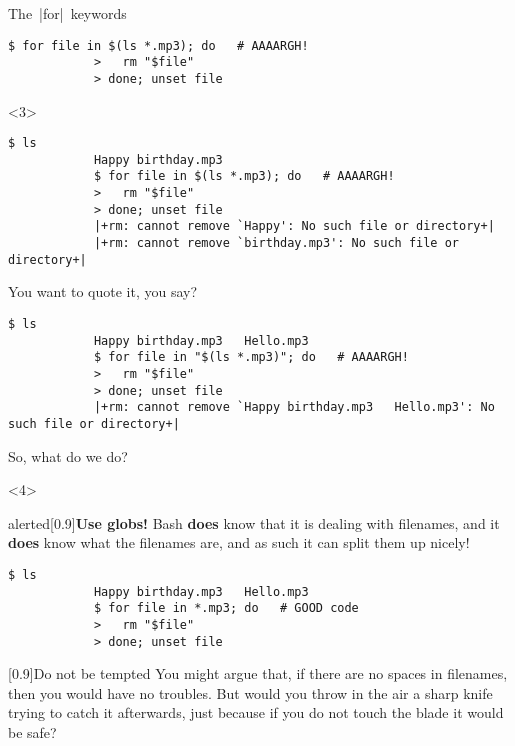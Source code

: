 \begin{frame}[fragile]{The \,\bash|for|\, keywords}
\begin{onlyenv}
\begin{lstlisting}[style=MyBash, xrightmargin=4mm]
            $ for file in $(ls *.mp3); do   # AAAARGH!
            >   rm "$file"
            > done; unset file
        \end{lstlisting}
    \end{onlyenv}
    \begin{onlyenv}<3>
        \begin{lstlisting}[style=MyBash, xrightmargin=4mm]
            $ ls
            Happy birthday.mp3
            $ for file in $(ls *.mp3); do   # AAAARGH!
            >   rm "$file"
            > done; unset file
            |+rm: cannot remove `Happy': No such file or directory+|
            |+rm: cannot remove `birthday.mp3': No such file or directory+|
        \end{lstlisting}
        \medskip
        You want to quote it, you say?
        \medskip
        \begin{lstlisting}[style=MyBash, xrightmargin=4mm]
            $ ls
            Happy birthday.mp3   Hello.mp3
            $ for file in "$(ls *.mp3)"; do   # AAAARGH!
            >   rm "$file"
            > done; unset file
            |+rm: cannot remove `Happy birthday.mp3   Hello.mp3': No such file or directory+|
        \end{lstlisting}
        \medskip
        So, what do we do?
    \end{onlyenv}
    \begin{onlyenv}<4>
        \begin{varblock}{alerted}[0.9\textwidth]{\textbf{Use globs!}}
            Bash \textbf{does} know that it is dealing with filenames, and it \textbf{does} know what the filenames are, and as such it can split them up nicely!
        \end{varblock}
        \medskip
        \begin{lstlisting}[style=MyBash, xrightmargin=4mm]
            $ ls
            Happy birthday.mp3   Hello.mp3
            $ for file in *.mp3; do   # GOOD code
            >   rm "$file"
            > done; unset file
        \end{lstlisting}
        \medskip
        \begin{varblock}{}[0.9\textwidth]{Do not be tempted}
            You might argue that, if there are no spaces in filenames, then you would have no troubles.
            But would you throw in the air a sharp knife trying to catch it afterwards, just because if you do not touch the blade it would be safe?
        \end{varblock}
    \end{onlyenv}
\end{frame}







